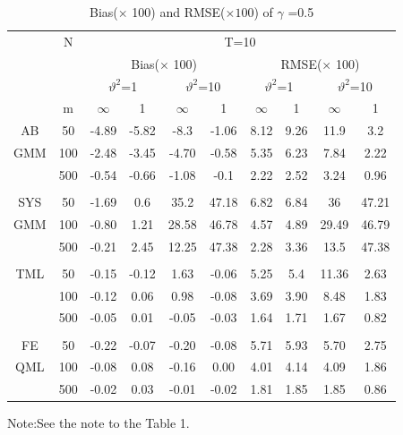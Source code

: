 \documentclass[12pt,a4paper,hyperref]{article}
\begin{document}
\begin{center}
\begin{table}[H]
\caption{Bias($\times$ 100) and RMSE($\times 100$) of $\gamma$ =0.5} \label{table2}
\centering
\begin{tabular} {*{10}{c}}
\toprule
&N& \multicolumn{8}{c}{T=10}\\
\cmidrule(lr){3-10}
&& \multicolumn{4}{c}{Bias($\times$ 100)} & \multicolumn{4}{c}{RMSE($\times$ 100)}\\
  \cmidrule(lr){3-6} \cmidrule(lr){7-10}
&&  \multicolumn{2}{c}{$\vartheta^{2}$=1}&\multicolumn{2}{c}{$\vartheta^{2}$=10} & \multicolumn{2}{c}{$\vartheta^{2}$=1}&\multicolumn{2}{c}{$\vartheta^{2}$=10}\\
\cmidrule(lr){3-4} \cmidrule(lr){5-6}\cmidrule(lr){7-8}\cmidrule(lr){9-10}
& m & $\infty$ &1&$\infty$ &1&$\infty$ &1&$\infty$&1\\
\cmidrule(lr){3-4} \cmidrule(lr){5-6}\cmidrule(lr){7-8}\cmidrule(lr){9-10}
AB &50 &-4.89&-5.82&-8.3&-1.06&8.12	&9.26&	11.9&3.2 \\
 GMM&100 &-2.48  & -3.45& -4.70 &-0.58  &5.35 &6.23 &7.84 & 2.22\\
 &500 &-0.54	&-0.66	&-1.08&	-0.1&2.22	&2.52&3.24&	0.96  \\
 \midrule \\
\cmidrule(lr){3-4} \cmidrule(lr){5-6}\cmidrule(lr){7-8}\cmidrule(lr){9-10}
SYS& 50 &-1.69&	0.6&35.2&47.18&6.82	&6.84	&36	&47.21\\
 GMM&100&-0.80&1.21 & 28.58& 46.78&4.57&4.89 & 29.49&46.79 \\
 &500 &-0.21&2.45&12.25&47.38&	2.28&	3.36&	13.5&47.38 \\
\midrule \\
\cmidrule(lr){3-4} \cmidrule(lr){5-6}\cmidrule(lr){7-8}\cmidrule(lr){9-10}
 TML&50 &-0.15&	-0.12&	1.63&	-0.06&5.25&5.4	&11.36&	2.63\\
 &100& -0.12 & 0.06& 0.98 & -0.08 &3.69 &  3.90& 8.48 & 1.83 \\
 &500 &-0.05 & 0.01 & -0.05	& -0.03	& 1.64	& 1.71	& 1.67 &0.82\\
 \midrule \\
\cmidrule(lr){3-4} \cmidrule(lr){5-6}\cmidrule(lr){7-8}\cmidrule(lr){9-10}
 FE&50 &-0.22	&-0.07	&-0.20&	-0.08	&5.71	&5.93	&5.70&	2.75
 \\
 QML&100&-0.08	&0.08	&-0.16&	0.00&	4.01&	4.14	&4.09	&1.86
\\
&500&-0.02	&0.03	&-0.01&	-0.02&1.81	&1.85&	1.85	&0.86
\\
\bottomrule
\end{tabular}
\begin{tablenotes}
      \small
      \item Note:See the note to the Table 1.
    \end{tablenotes}
\end{table}
\end{center}
\end{document}
